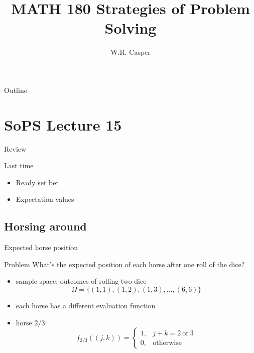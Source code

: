 \documentclass{beamer}
\title{MATH 180 Strategies of Problem Solving}
\subtitle
{} %
\author[W.R. Casper] %
{W.R. Casper}
\institute[California State University Fullerton] %
{
  Department of Mathematics\\
  California State University Fullerton}
\begin{document}
\begin{frame}
  \titlepage
\end{frame}

\begin{frame}{Outline}
  \tableofcontents
\end{frame}



\section{SoPS Lecture 15}

\begin{frame}{Review}
  \begin{block}{Last time}
    \begin{itemize}
\pause
      \item Ready set bet
\pause
      \item Expectation values
    \end{itemize}
  \end{block}
\end{frame}

\subsection{Horsing around}

\begin{frame}{Expected horse position}
  \begin{block}{Problem}
    What's the expected position of each horse after one roll of the dice?
    \begin{itemize}
\pause
      \item sample space: outcomes of rolling two dice
    $$\Omega = \{(1,1),(1,2),(1,3),\dots, (6,6)\}$$
\pause
      \item each horse has a different evaluation function 
\pause
      \item horse $2/3$:
        $$f_{2/3}((j,k)) = \left\lbrace\begin{array}{cc}1, & j+k=2\ \text{or}\ 3\\0, & \text{otherwise}\end{array}\right.$$
    \end{itemize}
  \end{block}
\end{frame}
\end{document}
